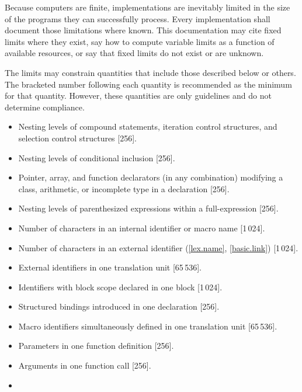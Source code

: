 
\pnum
Because computers are finite, \Cpp  implementations are inevitably
limited in the size of the programs they can successfully process.
Every implementation shall
document those limitations where known.
This documentation may cite fixed limits where they
exist, say how to compute variable limits as a function
of available resources, or say that fixed limits do not exist
or are unknown.

\pnum
The limits may constrain quantities
that include those described below or others.
The bracketed number following each quantity is recommended
as the minimum for that quantity.
However, these quantities are only guidelines and do not determine compliance.
\begin{itemize}
\item%
Nesting levels of compound statements,
iteration control structures,
and selection control structures [256].
\item%
Nesting levels of conditional inclusion [256].
\item%
Pointer, array, and function declarators
(in any combination)
modifying a class, arithmetic,
or incomplete type in a declaration [256].
\item%
Nesting levels of parenthesized expressions within a full-expression [256].
\item%
Number of
characters in an internal identifier
or macro name [1\,024].
\item%
Number of
characters in an external identifier (\ref{lex.name}, \ref{basic.link}) [1\,024].
\item%
External identifiers in one translation unit [65\,536].
\item%
Identifiers with block scope declared in one block [1\,024].
\item%
Structured bindings introduced in one declaration [256].
\item%
Macro identifiers simultaneously defined in one
translation
unit [65\,536].
\item%
Parameters in one function definition [256].
\item%
Arguments in one function call [256].
\item%

\end{itemize}
